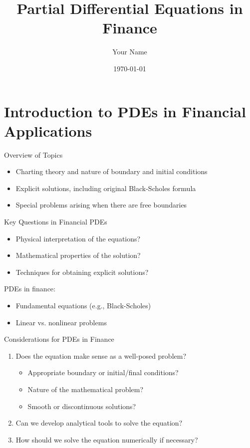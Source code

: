 \documentclass{beamer}
\title{Partial Differential Equations in Finance}
\author{Your Name}
\date{\today}
\begin{document}
\frame{\titlepage}

\section{Introduction to PDEs in Financial Applications}

\begin{frame}{Overview of Topics}
    \begin{itemize}
        \item Charting theory and nature of boundary and initial conditions
        \item Explicit solutions, including original Black-Scholes formula
        \item Special problems arising when there are free boundaries
    \end{itemize}
\end{frame}

\begin{frame}{Key Questions in Financial PDEs}
    \begin{itemize}
        \item Physical interpretation of the equations?
        \item Mathematical properties of the solution?
        \item Techniques for obtaining explicit solutions?
    \end{itemize}
    
    \vspace{1cm}
    PDEs in finance:
    \begin{itemize}
        \item Fundamental equations (e.g., Black-Scholes)
        \item Linear vs. nonlinear problems
    \end{itemize}
\end{frame}

\begin{frame}{Considerations for PDEs in Finance}
    \begin{enumerate}
        \item Does the equation make sense as a well-posed problem?
        \begin{itemize}
            \item Appropriate boundary or initial/final conditions?
            \item Nature of the mathematical problem?
            \item Smooth or discontinuous solutions?
        \end{itemize}
        
        \item Can we develop analytical tools to solve the equation?
        
        \item How should we solve the equation numerically if necessary?
    \end{enumerate}
\end{frame}
\end{document}
